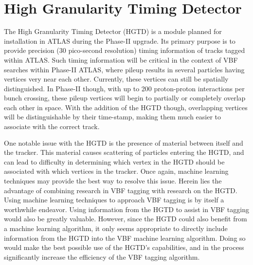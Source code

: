 \documentclass[12pt,letterpaper]{article}
\begin{document}
    
    



\section*{High Granularity Timing Detector}
    The High Granularity Timing Detector (HGTD) is a module planned for installation in ATLAS during the Phase-II upgrade. Its primary purpose is to provide precision (30 pico-second resolution) timing information of tracks tagged within ATLAS. Such timing information will be critical in the context of VBF searches within Phase-II ATLAS, where pileup results in several particles having vertices very near each other. Currently, these vertices can still be spatially distinguished. In Phase-II though, with up to 200 proton-proton interactions per bunch crossing, these pileup vertices will begin to partially or completely overlap each other in space. With the addition of the HGTD though, overlapping vertices will be distinguishable by their time-stamp, making them much easier to associate with the correct track. 
    
    One notable issue with the HGTD is the presence of material between itself and the tracker. This material causes scattering of particles entering the HGTD, and can lead to difficulty in determining which vertex in the HGTD should be associated with which vertices in the tracker. Once again, machine learning techniques may provide the best way to resolve this issue. Herein lies the advantage of combining research in VBF tagging with research on the HGTD. Using machine learning techniques to approach VBF tagging is by itself a worthwhile endeavor. Using information from the HGTD to assist in VBF tagging would also be greatly valuable. However, since the HGTD could also benefit from a machine learning algorithm, it only seems appropriate to directly include information from the HGTD into the VBF machine learning algorithm. Doing so would make the best possible use of the HGTD's capabilities, and in the process significantly increase the efficiency of the VBF tagging algorithm.
\end{document}
